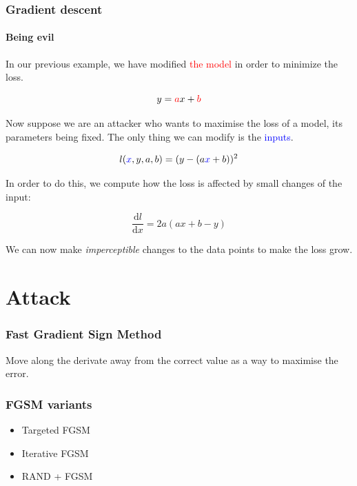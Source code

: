 \documentclass[9pt]{beamer}
\begin{document}
\begin{frame}
  \frametitle{Gradient descent}

  \framesubtitle{Being evil}

  \vspace{-0.5cm}

  \begin{center}
    \scalebox{0.5}{
      
    }
  \end{center}

  In our previous example, we have modified \textcolor{red}{the model}
  in order to minimize the loss.

  \[
  y = \textcolor{red}{a}x + \textcolor{red}{b}
  \]

  \pause

  Now suppose we are an attacker who wants to maximise the loss of a
  model, its parameters being fixed. The only thing we can modify is
  the \textcolor{blue}{inputs}.

  \[
  l(\textcolor{blue}{x}, y, a, b) = (y - (a \textcolor{blue}{x} + b))^{2}
  \]

  \pause

  In order to do this, we compute how the loss is affected by small
  changes of the input:

  \[
  \frac{\mathrm{d}l}{\mathrm{d}x} = 2 a (ax + b - y)
  \]

  We can now make \emph{imperceptible} changes to the data points to make
  the loss grow.
\end{frame}

\section{Attack}

\begin{frame}
  \frametitle{Fast Gradient Sign Method}

  Move along the derivate away from the correct value as a way to
  maximise the error.
\end{frame}

\begin{frame}
  \frametitle{FGSM variants}

  \begin{itemize}
  \item Targeted FGSM
  \item Iterative FGSM
  \item RAND + FGSM
  \end{itemize}
\end{frame}
\end{document}
